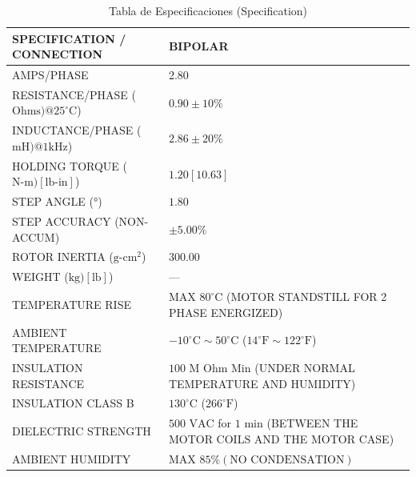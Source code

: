 \begin{table}[H]
\centering
\caption{Tabla de Especificaciones (Specification)}
\label{tab:motor-especificaciones}
\begin{tabular}{|p{6cm}|p{7.5cm}|}
\hline
\textbf{SPECIFICATION / CONNECTION} & \textbf{BIPOLAR} \\
\hline
AMPS/PHASE & 2.80 \\
\hline
RESISTANCE/PHASE ($\text{Ohms}) @ 25^{\circ}\text{C}$) & $0.90 \pm 10\%$ \\
\hline
INDUCTANCE/PHASE ($\text{mH}) @ 1 \text{kHz}$) & $2.86 \pm 20\%$ \\
\hline
HOLDING TORQUE ($\text{N-m}) [\text{lb-in}]$) & $1.20 [10.63]$ \\
\hline
STEP ANGLE (°) & $1.80$ \\
\hline
STEP ACCURACY (NON-ACCUM) & $\pm 5.00\%$ \\
\hline
ROTOR INERTIA ($\text{g-cm}^2$) & $300.00$ \\
\hline
WEIGHT ($\text{kg}) [\text{lb}]$) & --- \\
\hline
TEMPERATURE RISE & $\text{MAX } 80^{\circ}\text{C}$ (MOTOR STANDSTILL FOR 2 PHASE ENERGIZED) \\
\hline
AMBIENT TEMPERATURE & $-10^{\circ}\text{C} \sim 50^{\circ}\text{C}$ ($14^{\circ}\text{F} \sim 122^{\circ}\text{F}$) \\
\hline
INSULATION RESISTANCE & $100 \text{ M Ohm Min}$ (UNDER NORMAL TEMPERATURE AND HUMIDITY) \\
\hline
INSULATION CLASS B & $130^{\circ}\text{C}$ ($266^{\circ}\text{F}$) \\
\hline
DIELECTRIC STRENGTH & $500 \text{ VAC}$ for $1 \text{ min}$ (BETWEEN THE MOTOR COILS AND THE MOTOR CASE) \\
\hline
AMBIENT HUMIDITY & $\text{MAX } 85\% (\text{NO CONDENSATION})$ \\
\hline
\end{tabular}
\end{table}